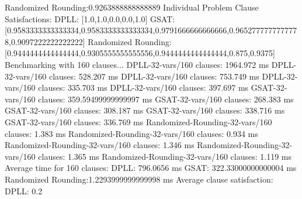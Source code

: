 \documentclass{article}
\begin{document}
  Randomized Rounding:0.9263888888888889\newline
\newline
Individual Problem Clause Satisfactions:\newline
  DPLL:               [1.0,1.0,0.0,0.0,1.0]\newline
  GSAT:               [0.9583333333333334,0.9583333333333334,0.9791666666666666,0.9652777777777778,0.9097222222222222]\newline
  Randomized Rounding:[0.9444444444444444,0.9305555555555556,0.9444444444444444,0.875,0.9375]\newline
\newline
\newline
Benchmarking with 160 clauses...\newline
DPLL-32-vars/160 clauses: 1964.972 ms\newline
DPLL-32-vars/160 clauses: 528.207 ms\newline
DPLL-32-vars/160 clauses: 753.749 ms\newline
DPLL-32-vars/160 clauses: 335.703 ms\newline
DPLL-32-vars/160 clauses: 397.697 ms\newline
GSAT-32-vars/160 clauses: 359.59499999999997 ms\newline
GSAT-32-vars/160 clauses: 268.383 ms\newline
GSAT-32-vars/160 clauses: 308.187 ms\newline
GSAT-32-vars/160 clauses: 338.716 ms\newline
GSAT-32-vars/160 clauses: 336.769 ms\newline
Randomized-Rounding-32-vars/160 clauses: 1.383 ms\newline
Randomized-Rounding-32-vars/160 clauses: 0.934 ms\newline
Randomized-Rounding-32-vars/160 clauses: 1.346 ms\newline
Randomized-Rounding-32-vars/160 clauses: 1.365 ms\newline
Randomized-Rounding-32-vars/160 clauses: 1.119 ms\newline
Average time for 160 clauses:\newline
  DPLL:               796.0656 ms\newline
  GSAT:               322.33000000000004 ms\newline
  Randomized Rounding:1.2293999999999998 ms\newline
Average clause satisfaction:\newline
  DPLL:               0.2\newline
\end{document}
